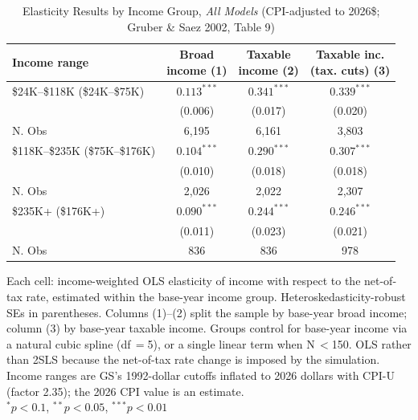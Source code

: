 \begin{table}[!htbp] \centering
  \caption{Elasticity Results by Income Group, \textit{All Models} (CPI-adjusted to 2026\$; Gruber \& Saez 2002, Table 9)}
  \label{tab:obs_regs_income}
  \begin{tabular}{lccc}
  \toprule
  Income range & \shortstack{Broad \\ income (1)} & \shortstack{Taxable \\ income (2)} & \shortstack{Taxable inc. \\ (tax. cuts) (3)} \\
  \midrule
  \$24K--\$118K (\$24K--\$75K) & $0.113^{***}$ & $0.341^{***}$ & $0.339^{***}$ \\
  & (0.006) & (0.017) & (0.020) \\
  N. Obs & 6,195 & 6,161 & 3,803 \\[10pt]
  \$118K--\$235K (\$75K--\$176K) & $0.104^{***}$ & $0.290^{***}$ & $0.307^{***}$ \\
  & (0.010) & (0.018) & (0.018) \\ 
  N. Obs & 2,026 & 2,022 & 2,307 \\[10pt]
  \$235K+ (\$176K+) & $0.090^{***}$ & $0.244^{***}$ & $0.246^{***}$ \\
  & (0.011) & (0.023) & (0.021) \\ 
  N. Obs & 836 & 836 & 978 \\[2pt]
  \bottomrule
  \end{tabular}
  \begin{flushleft}\footnotesize
  Each cell: income-weighted OLS elasticity of income with respect to the net-of-tax rate, estimated within the base-year income group. Heteroskedasticity-robust SEs in parentheses. Columns (1)--(2) split the sample by base-year broad income; column (3) by base-year taxable income. Groups control for base-year income via a natural cubic spline (df\,$=$5), or a single linear term when N\,$<$150. OLS rather than 2SLS because the net-of-tax rate change is imposed by the simulation. Income ranges are GS's 1992-dollar cutoffs inflated to 2026 dollars with CPI-U (factor 2.35); the 2026 CPI value is an estimate.\\
  $^{*}p<0.1$, $^{**}p<0.05$, $^{***}p<0.01$
  \end{flushleft}
\end{table}